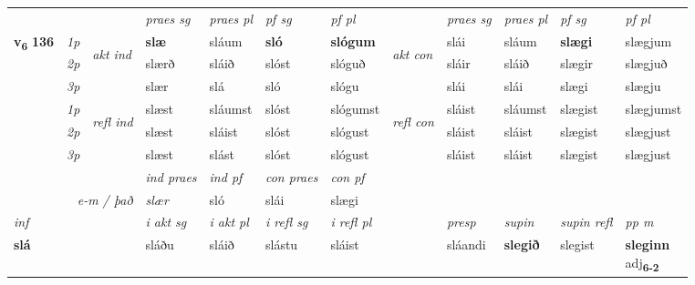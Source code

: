 \begin{longtable}[l]{X>{\footnotesize\itshape}llXXXXlXXXX}
 & &   & \textit{praes sg}  & \textit{praes pl}    & \textit{ pf sg} & \textit{pf pl} & & \textit{praes sg}  & \textit{praes pl}    & \textit{pf sg} & \textit{pf pl }  \\ \cmidrule{4-7} \cmidrule{9-12}
 \multirow{2}{*}{{{\textbf{v{\textsubscript{6}}} \Large{\textbf{136}}}}}  & 1p & \multirow{3}{*}{\begin{turn}{90}\textit{akt ind}\end{turn}} & \textbf{slæ} & sláum & \textbf{sló} & \textbf{slógum} & \multirow{3}{*}{\begin{turn}{90}\textit{akt con}\end{turn}} &slái & sláum & \textbf{slægi} & slægjum\\*
 & 2p &  &  slærð  & sláið & slóst & slóguð & & sláir & sláið & slægir & slægjuð \\*
 & 3p &  & slær & slá & sló & slógu & & slái & slái& slægi & slægju \\*
\cmidrule{4-7} \cmidrule{9-12}
 & 1p & \multirow{3}{*}{\begin{turn}{90}\textit{refl ind}\end{turn}}  & slæst & sláumst & slóst & slógumst & \multirow{3}{*}{\begin{turn}{90}\textit{refl con}\end{turn}}  &sláist & sláumst & slægist & slægjumst \\*
 & 2p &  & slæst & sláist & slóst & slógust & &sláist & sláist & slægist & slægjust \\*
 & 3p  & & slæst & slást & slóst & slógust & & sláist & sláist& slægist & slægjust \\*
\cmidrule{4-7} \cmidrule{9-12}

   && &  \textit{ind praes} & \textit{ind pf} & \textit{con praes} & \textit{con pf} \\*
\multicolumn{3}{r}{\textit{e-m / það}} & slær & sló & slái & slægi \\*

\cmidrule{4-7}
   {\textit{inf}} & &  & \textit{i akt sg} & \textit{i akt pl} & \textit{i refl sg} & \textit{i refl pl} && \textit{presp} & \textit{supin} & \textit{supin refl} & \textit{pp m} \\*
  {\textbf{slá}} & && sláðu  & sláið & slástu & sláist && sláandi &  \textbf{slegið} & slegist & \specialcell{\textbf{sleginn} \\ adj\textbf{\textsubscript{6-2}}} \\*

\midrule


\end{longtable}
